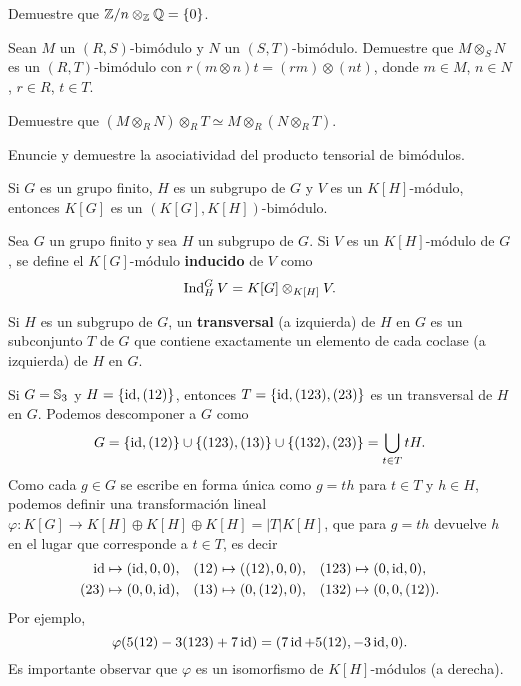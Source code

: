 \begin{exercise}
    Demuestre que $\mathbb{Z}/n\otimes_{\mathbb{Z}}\mathbb{Q}=\{0\}$.
\end{exercise}

\begin{exercise}
    Sean $M$ un $(R,S)$-bimódulo y $N$ un $(S,T)$-bimódulo. 
    Demuestre que $M\otimes_SN$ es un $(R,T)$-bimódulo 
    con $r(m\otimes n)t=(rm)\otimes (nt)$, 
    donde $m\in M$, $n\in N$, $r\in R$, $t\in T$.
\end{exercise}

\begin{exercise}
    Demuestre que $(M\otimes_R N)\otimes_RT\simeq M\otimes_R (N\otimes_RT)$.
\end{exercise}

\begin{exercise}
    Enuncie y demuestre la asociatividad del producto tensorial de bimódulos. 
\end{exercise}


Si $G$ es un grupo finito, $H$ es un subgrupo de $G$
y $V$ es un $K[H]$-módulo, entonces 
$K[G]$ es un $(K[G],K[H])$-bimódulo.

\begin{definition}
Sea $G$ un grupo finito y sea 
$H$ un subgrupo de $G$. 
Si $V$ es un $K[H]$-módulo de $G$, 
se define el $K[G]$-módulo \textbf{inducido} de $V$ 
como
\[
\operatorname{Ind}_H^GV=K[G]\otimes_{K[H]}V.
\]
\end{definition}

Si $H$ es un subgrupo de $G$, un \textbf{transversal} (a izquierda) 
de $H$ en $G$ es un subconjunto $T$ de $G$ que contiene exactamente un elemento de cada coclase (a izquierda) 
de $H$ en $G$. 

\begin{example}
Si $G=\mathbb{S}_3$ y $H=\{\operatorname{id},(12)\}$, entonces
$T=\{\operatorname{id},(123),(23)\}$ es un transversal de $H$ en $G$. Podemos descomponer 
a $G$ como
\[
G=\{\operatorname{id},(12)\}\cup \{(123),(13)\}\cup\{(132),(23)\}=\bigcup_{t\in T}tH.
\]
Como cada $g\in G$ se escribe en forma única como $g=th$ para $t\in T$ y $h\in H$, podemos 
definir una transformación lineal 
$\varphi\colon K[G]\to K[H]\oplus K[H]\oplus K[H]=|T|K[H]$, que para $g=th$ devuelve $h$ en el lugar que corresponde a $t\in T$, es decir
\begin{align*}
\operatorname{id}&\mapsto (\operatorname{id},0,0), && (12)\mapsto ((12),0,0), && (123)\mapsto (0,\operatorname{id},0),\\
(23)&\mapsto (0,0,\operatorname{id}), && (13)\mapsto (0,(12),0), && (132)\mapsto (0,0,(12)).
\end{align*}
Por ejemplo, 
\[
\varphi( 5(12)-3(123)+7\operatorname{id} )=(7\operatorname{id}+5(12),-3\operatorname{id},0).
\]
Es importante observar que $\varphi$ es un isomorfismo de $K[H]$-módulos (a derecha). 
\end{example}

